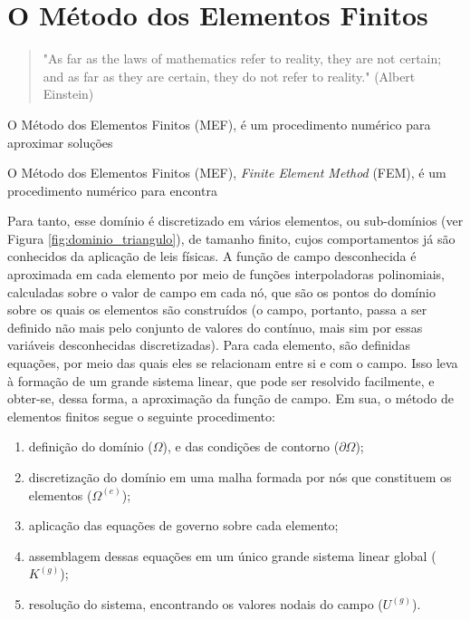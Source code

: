 \chapter{O Método dos Elementos Finitos}

\begin{quote}
    "As far as the laws of mathematics refer to reality, they are not certain; and as far as they are certain, they do not refer to reality." (Albert Einstein)
\end{quote}


O Método dos Elementos Finitos (MEF), é um procedimento numérico para aproximar soluções 


O Método dos Elementos Finitos (MEF), \emph{Finite Element Method} (FEM), é um procedimento numérico para encontra 

Para tanto, esse domínio é discretizado em vários elementos, ou sub-domínios (ver Figura \ref{fig:dominio_triangulo}), de tamanho finito, cujos comportamentos já são conhecidos da aplicação de leis físicas. A função de campo desconhecida é aproximada em cada elemento por meio de funções interpoladoras polinomiais, calculadas sobre o valor de campo em cada nó, que são os pontos do domínio sobre os quais os elementos são construídos (o campo, portanto, passa a ser definido não mais pelo conjunto de valores do contínuo, mais sim por essas variáveis desconhecidas discretizadas). Para cada elemento, são definidas equações, por meio das quais eles se relacionam entre si e com o campo. Isso leva à formação de um grande sistema linear, que pode ser resolvido facilmente, e obter-se, dessa forma, a aproximação da função de campo. \cite{Onate} Em sua, o método de elementos finitos segue o seguinte procedimento:

\begin{enumerate}
    \item definição do domínio ($\Omega$), e das condições de contorno ($\partial\Omega$);
    \item discretização do domínio em uma malha formada por nós que constituem os elementos ($\Omega^{(e)}$);
    \item aplicação das equações de governo sobre cada elemento;
    \item assemblagem dessas equações em um único grande sistema linear global ($K^{(g)}$);
    \item resolução do sistema, encontrando os valores nodais do campo ($U^{(g)}$).
\end{enumerate}



